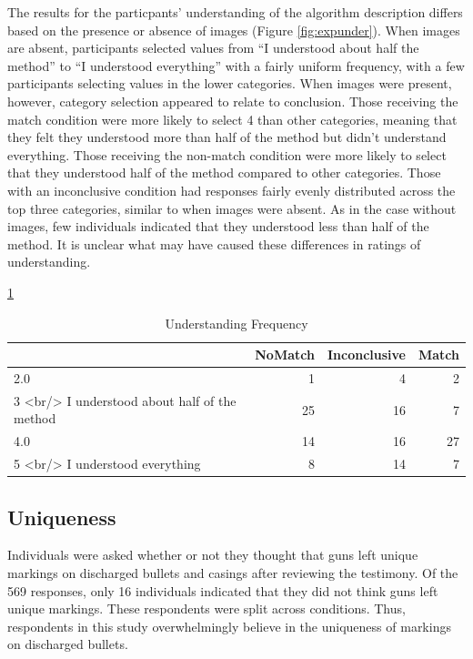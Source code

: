 \documentclass[print]{nuthesis}
\begin{document}
The results for the particpants' understanding of the algorithm description differs based on the presence or absence of images (Figure \ref{fig:expunder}).
When images are absent, participants selected values from ``I understood about half the method'' to ``I understood everything'' with a fairly uniform frequency, with a few participants selecting values in the lower categories.
When images were present, however, category selection appeared to relate to conclusion.
Those receiving the match condition were more likely to select 4 than other categories, meaning that they felt they understood more than half of the method but didn't understand everything.
Those receiving the non-match condition were more likely to select that they understood half of the method compared to other categories.
Those with an inconclusive condition had responses fairly evenly distributed across the top three categories, similar to when images were absent.
As in the case without images, few individuals indicated that they understood less than half of the method.
It is unclear what may have caused these differences in ratings of understanding.

 \ref{tab:undertb}

\begin{table}

\caption{\label{tab:undertb}Understanding Frequency}
\centering
\begin{tabular}[t]{l|r|r|r}
\hline
  & NoMatch & Inconclusive & Match\\
\hline
2.0 & 1 & 4 & 2\\
\hline
3 <br/> I understood about half of the method & 25 & 16 & 7\\
\hline
4.0 & 14 & 16 & 27\\
\hline
5 <br/> I understood everything & 8 & 14 & 7\\
\hline
\end{tabular}
\end{table}

\hypertarget{uniqueness}{%
\subsection{Uniqueness}\label{uniqueness}}

Individuals were asked whether or not they thought that guns left unique markings on discharged bullets and casings after reviewing the testimony.
Of the 569 responses, only 16 individuals indicated that they did not think guns left unique markings.
These respondents were split across conditions.
Thus, respondents in this study overwhelmingly believe in the uniqueness of markings on discharged bullets.
\end{document}
